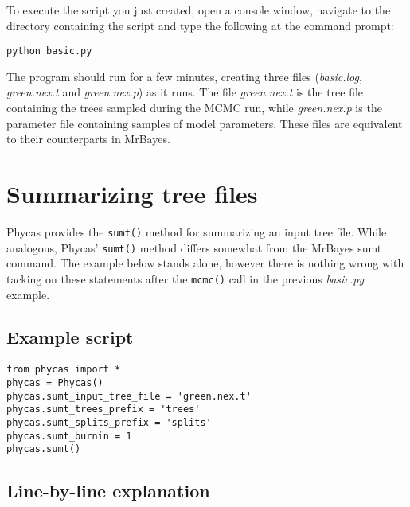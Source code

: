 \documentclass[10pt]{article}
\newcommand{\pathname}[1]{{\em #1}}			%
\begin{document}
To execute the  script you just created, open a console window, navigate to the directory containing the script and type the following at the command prompt:
%
\begin{verbatim}
python basic.py
\end{verbatim}
%
The program should run for a few minutes, creating three files (\pathname{basic.log}, \pathname{green.nex.t} and \pathname{green.nex.p}) as it runs. The file \pathname{green.nex.t} is the tree file containing the trees sampled during the MCMC run, while \pathname{green.nex.p} is the parameter file containing samples of model parameters. These files are equivalent to their counterparts in MrBayes.

\section{Summarizing tree files}

Phycas provides the {\tt sumt()} method for summarizing an input tree file. While analogous, Phycas' {\tt sumt()} method differs somewhat from the MrBayes sumt command. The example below stands alone, however there is nothing wrong with tacking on these statements after the {\tt mcmc()} call in the previous \pathname{basic.py} example.

\subsection{Example script}

\begin{verbatim}
from phycas import *
phycas = Phycas()
phycas.sumt_input_tree_file = 'green.nex.t'
phycas.sumt_trees_prefix = 'trees'
phycas.sumt_splits_prefix = 'splits'
phycas.sumt_burnin = 1
phycas.sumt()
\end{verbatim}

\subsection{Line-by-line explanation}
\end{document}
